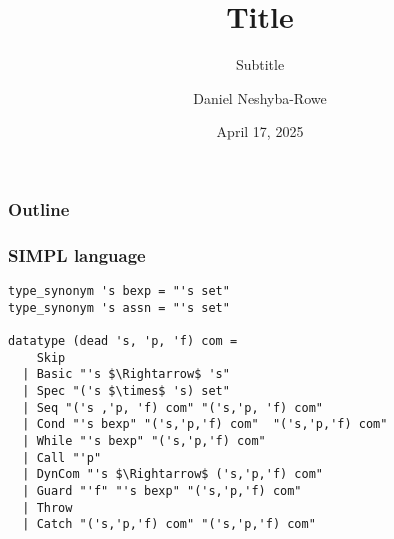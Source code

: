 \documentclass{beamer}
\title{Title}
\subtitle{Subtitle}
\author{Daniel Neshyba-Rowe}
\institute{Lewis \& Clark College}
\date{April 17, 2025}
\begin{document}
\begin{frame}
\titlepage
\end{frame}

\begin{frame}
\frametitle{Outline}
\tableofcontents
\end{frame}


\begin{frame}[fragile]
\frametitle{SIMPL language}
\begin{lstlisting}
type_synonym 's bexp = "'s set"
type_synonym 's assn = "'s set"

datatype (dead 's, 'p, 'f) com =
    Skip
  | Basic "'s $\Rightarrow$ 's"
  | Spec "('s $\times$ 's) set"
  | Seq "('s ,'p, 'f) com" "('s,'p, 'f) com"
  | Cond "'s bexp" "('s,'p,'f) com"  "('s,'p,'f) com"
  | While "'s bexp" "('s,'p,'f) com"
  | Call "'p"
  | DynCom "'s $\Rightarrow$ ('s,'p,'f) com"
  | Guard "'f" "'s bexp" "('s,'p,'f) com"
  | Throw
  | Catch "('s,'p,'f) com" "('s,'p,'f) com"
\end{lstlisting}
\end{frame}


    
\end{document}
